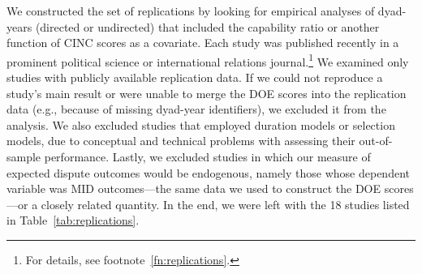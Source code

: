 
We constructed the set of replications by looking for empirical analyses of dyad-years (directed or undirected) that included the capability ratio or another function of CINC scores as a covariate.
Each study was published recently in a prominent political science or international relations journal.\footnote{%
  For details, see footnote~\ref{fn:replications}.
}
We examined only studies with publicly available replication data.
If we could not reproduce a study's main result or were unable to merge the DOE scores into the replication data (e.g., because of missing dyad-year identifiers), we excluded it from the analysis.
We also excluded studies that employed duration models or selection models, due to conceptual and technical problems with assessing their out-of-sample performance.
Lastly, we excluded studies in which our measure of expected dispute outcomes would be endogenous, namely those whose dependent variable was MID outcomes---the same data we used to construct the DOE scores---or a closely related quantity.
In the end, we were left with the 18 studies listed in Table~\ref{tab:replications}.

